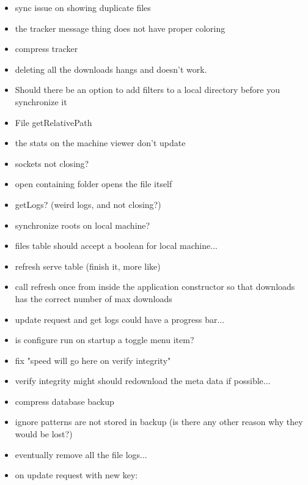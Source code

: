\documentclass{article}
\begin{document}
\begin{itemize}
\item sync issue on showing duplicate files
\item the tracker message thing does not have proper coloring
\item compress tracker
\item deleting all the downloads hangs and doesn't work.
\item Should there be an option to add filters to a local directory before you synchronize it
\item File getRelativePath
\item the stats on the machine viewer don't update
\item sockets not closing?
\item open containing folder opens the file itself

\item getLogs?  (weird logs, and not closing?)
\item synchronize roots on local machine?


\item files table should accept a boolean for local machine...
\item refresh serve table (finish it, more like)
\item call refresh once from inside the application constructor so that downloads has the correct number of max downloads
\item update request and get logs could have a progress bar...

\item is configure run on startup a toggle menu item?
\item fix "speed will go here on verify integrity"
\item verify integrity might should redownload the meta data if possible...
\item compress database backup
\item ignore patterns are not stored in backup (is there any other reason why they would be lost?)
\item eventually remove all the file logs...

\item on update request with new key:
\end{itemize}
\end{document}
